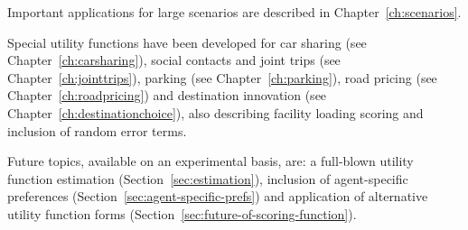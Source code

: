 Important applications for large scenarios are described in Chapter~\ref{ch:scenarios}.

Special utility functions have been developed for car sharing (see Chapter~\ref{ch:carsharing}), social contacts and joint trips (see Chapter~\ref{ch:jointtrips}), parking (see Chapter~\ref{ch:parking}), road pricing (see Chapter~\ref{ch:roadpricing}) and destination innovation (see Chapter~\ref{ch:destinationchoice}), also describing facility loading scoring and inclusion of random error terms. 
 
Future topics, available on an experimental basis, are: a full-blown utility function estimation (Section~\ref{sec:estimation}), inclusion of agent-specific preferences (Section~\ref{sec:agent-specific-prefs}) and application of alternative utility function forms (Section~\ref{sec:future-of-scoring-function}).

